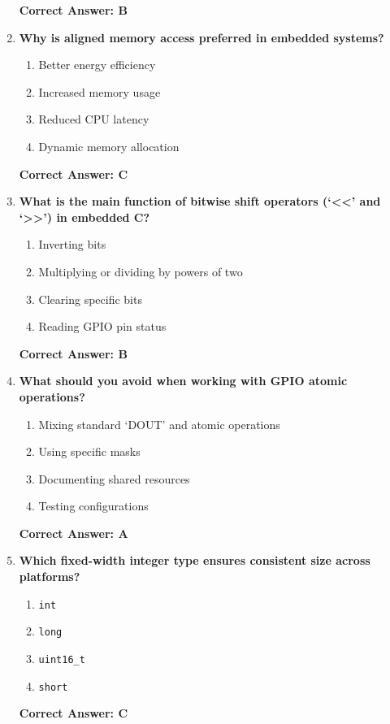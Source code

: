 \documentclass[
  9pt,
  letterpaper,
  abstract,
  titlepage]{scrbook}
\begin{document}
\begin{enumerate}
  \textbf{Correct Answer: B}
\item
  \textbf{Why is aligned memory access preferred in embedded systems?}

  \begin{enumerate}
  \def\labelenumii{\arabic{enumii}.}
  \item
    Better energy efficiency
  \item
    Increased memory usage
  \item
    Reduced CPU latency
  \item
    Dynamic memory allocation
  \end{enumerate}

  \textbf{Correct Answer: C}
\item
  \textbf{What is the main function of bitwise shift operators
  (`\textless\textless{}' and `\textgreater\textgreater{}') in embedded
  C?}

  \begin{enumerate}
  \def\labelenumii{\arabic{enumii}.}
  \item
    Inverting bits
  \item
    Multiplying or dividing by powers of two
  \item
    Clearing specific bits
  \item
    Reading GPIO pin status
  \end{enumerate}

  \textbf{Correct Answer: B}
\item
  \textbf{What should you avoid when working with GPIO atomic
  operations?}

  \begin{enumerate}
  \def\labelenumii{\arabic{enumii}.}
  \item
    Mixing standard `DOUT' and atomic operations
  \item
    Using specific masks
  \item
    Documenting shared resources
  \item
    Testing configurations
  \end{enumerate}

  \textbf{Correct Answer: A}
\item
  \textbf{Which fixed-width integer type ensures consistent size across
  platforms?}

  \begin{enumerate}
  \def\labelenumii{\arabic{enumii}.}
  \item
    \texttt{int}
  \item
    \texttt{long}
  \item
    \texttt{uint16\_t}
  \item
    \texttt{short}
  \end{enumerate}

  \textbf{Correct Answer: C}
\end{enumerate}
\end{document}
